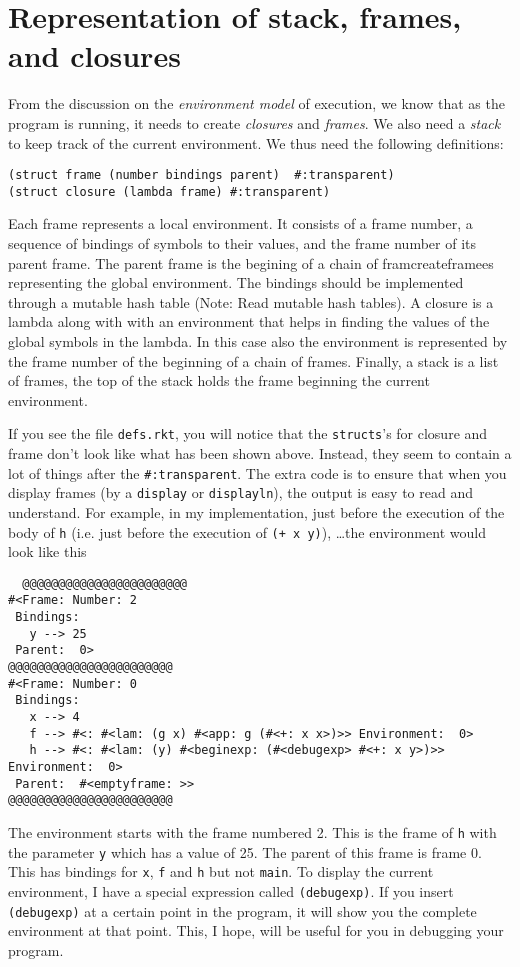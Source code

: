 \documentclass[11pt]{article}
\begin{document}
\section{Representation of stack, frames, and closures}
From the discussion on the \textit{environment model} of execution, we know that as the program is running, it needs to create \textit{closures} and \textit{frames}. We also need a \textit{stack} to keep track of the current environment. We thus need the following definitions:
\begin{verbatim}
(struct frame (number bindings parent)  #:transparent)   
(struct closure (lambda frame) #:transparent)
\end{verbatim}
Each frame represents a local environment. It consists of a frame number, a sequence of bindings of symbols to their values,  and the frame number of its parent frame. The parent frame is  the begining of a chain of framcreateframees representing the global environment. 
The bindings should be implemented through a mutable hash table (Note: Read mutable hash tables). A closure is a lambda along with with an environment that helps in finding the values of the global symbols in the lambda. In this case also the environment is represented by the frame number of the beginning of a chain of frames. Finally, a stack is a list of frames, the top of the stack holds the frame beginning the current environment.

If you see the file {\tt defs.rkt}, you will notice that the {\tt structs}'s for closure and frame don't look like what has been shown above. Instead, they seem to contain  a lot of things after the {\tt \#:transparent}. The extra code is to ensure that when you display frames (by a {\tt display} or {\tt displayln}), the output is easy to read and understand. For example, in my implementation, just before the execution of the body of {\tt h} (i.e. just before the execution of {\tt (+ x y)}), \dots the  environment would look like this 

\begin{verbatim}
  @@@@@@@@@@@@@@@@@@@@@@@
#<Frame: Number: 2
 Bindings: 
   y --> 25 
 Parent:  0>
@@@@@@@@@@@@@@@@@@@@@@@
#<Frame: Number: 0
 Bindings: 
   x --> 4
   f --> #<: #<lam: (g x) #<app: g (#<+: x x>)>> Environment:  0>
   h --> #<: #<lam: (y) #<beginexp: (#<debugexp> #<+: x y>)>> Environment:  0> 
 Parent:  #<emptyframe: >>
@@@@@@@@@@@@@@@@@@@@@@@
\end{verbatim}
The environment starts with the frame numbered 2. This is the frame of {\tt h} with the parameter  {\tt y} which has a value of 25. The parent of this frame  is frame 0. This has bindings for {\tt x}, {\tt f} and {\tt h} but not {\tt main}.  To display the  current environment, I have a special expression called {\tt (debugexp)}. If you insert {\tt (debugexp)} at a certain point in the program, it will show you the complete environment at that point. This, I hope, will be useful for you in debugging your program.   
\end{document}
